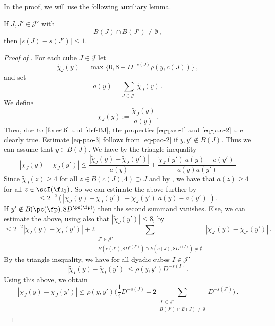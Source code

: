     In the proof, we will use the following auxiliary lemma.

    \begin{lemma}
        \label{moderate-scale-change}
        \leanok

        If $J, J' \in \mathcal{J'}$ with
        $$
            B(J) \cap B(J') \ne \emptyset\,,
        $$
        then $|s(J) - s(J')| \le 1$.
    \end{lemma}

    \begin{proof}[Proof of ]
        For each cube $J \in \mathcal{J}$ let
        $$
            \tilde\chi_J(y) = \max\{0, 8 - D^{-s(J)} \rho(y, c(J))\}\,,
        $$
        and set
        $$
            a(y) = \sum_{J \in \mathcal{J}'} \tilde \chi_J(y)\,.
        $$
        We define
        \[
            \chi_J(y) := \frac{\tilde \chi_J(y)}{a(y)}\,.
        \]
        Then, due to \eqref{forest6} and \eqref{def-BJ}, the properties \eqref{eq-pao-1} and \eqref{eq-pao-2} are clearly true. Estimate \eqref{eq-pao-3} follows from \eqref{eq-pao-2} if $y, y' \notin B(J)$. Thus we can assume that $y \in B(J)$. We have by the triangle inequality
        $$
            |\chi_J(y) - \chi_J(y')| \le \frac{|\tilde \chi_J(y) - \tilde \chi_J(y')|}{a(y)} + \frac{\tilde \chi_J(y')|a(y) - a(y')|}{a(y)a(y')}
        $$
        Since $\tilde \chi_J(z) \ge 4$ for all $z \in B(c(J), 4) \supset J$ and by , we have that $a(z) \ge 4$ for all $z \in \scI(\fu_1)$. So we can estimate the above further by
        $$
            \le 2^{-2}(|\tilde \chi_J(y) - \tilde \chi_J(y')| + \tilde \chi_J(y')|a(y) - a(y')|)\,.
        $$
        If $y' \notin B(\pc(\fp), 8D^{\ps(\fp)})$ then the second summand vanishes. Else, we can estimate the above, using also that $|\tilde \chi_J(y')| \le 8$, by
        $$
            \le 2^{-2} |\tilde \chi_J(y) - \tilde \chi_J(y')| + 2 \sum_{\substack{J' \in \mathcal{J}'\\ B(c(J'), 8D^{s(J')}) \cap B(c(J), 8D^{s(J)}) \ne \emptyset}}|\tilde \chi_{J'}(y) - \tilde \chi_{J'} (y')|\,.
        $$
        By the triangle inequality, we have for all dyadic cubes $I \in \mathcal{J}'$
        $$
            |\tilde \chi_I(y) - \tilde \chi_I(y')| \le \rho(y, y') D^{-s(I)}\,.
        $$
        Using this above, we obtain
        $$
            |\chi_J(y) - \chi_J(y')| \le \rho(y,y') \Big( \frac{1}{4} D^{-s(J)} + 2 \sum_{\substack{J' \in \mathcal{J}'\\ B(J') \cap B(J) \ne \emptyset}} D^{-s(J')}\Big)\,.
$$
\end{proof}
